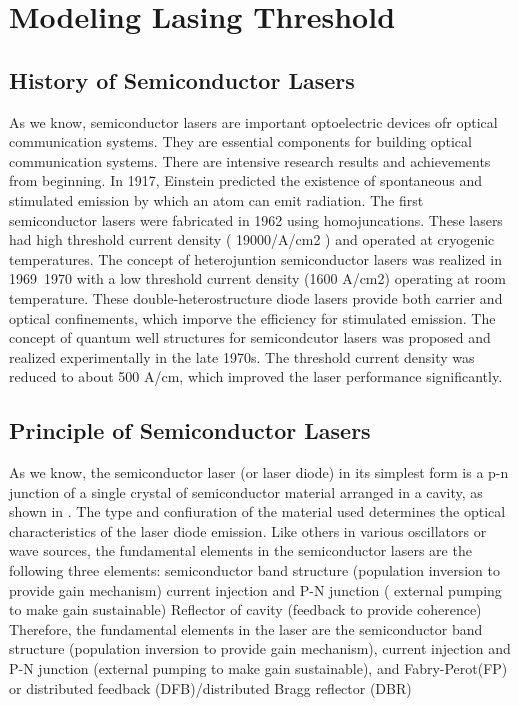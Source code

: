 \chapter{Modeling Lasing Threshold} \label{LT}


\section{History of Semiconductor Lasers} \label{corrections} As we know,
semiconductor lasers are important optoelectric devices ofr optical
communication systems. They are essential components for building optical
communication systems. There are intensive research results and achievements
from beginning.  In 1917, Einstein predicted the existence of spontaneous and
stimulated emission by which an atom can emit radiation. The first
semiconductor lasers were fabricated in 1962 using homojuncations. These lasers
had high threshold current density ( 19000/A/cm2 ) and operated at cryogenic
temperatures.  The concept of heterojuntion semiconductor lasers was realized
in 1969~1970 with a low threshold current density (1600 A/cm2) operating at
room temperature. These double-heterostructure diode lasers provide both
carrier and optical confinements, which imporve the efficiency for stimulated
emission.  The concept of quantum well structures for semicondcutor lasers was
proposed and realized experimentally in the late 1970s. The threshold current
density was reduced to about 500 A/cm, which improved the laser performance
significantly.

\section{Principle of Semiconductor Lasers} \label{corrections}

As we know, the semiconductor laser (or laser diode) in its simplest form is a
p-n junction of a single crystal of semiconductor material arranged in a
cavity, as shown in . The type and confiuration of the material used determines
the optical characteristics of the laser diode emission. Like others in various
oscillators or wave sources, the fundamental elements in the semiconductor
lasers are the following three elements: semiconductor band structure
(population inversion to provide gain mechanism) current injection and P-N
junction ( external pumping to make gain sustainable) Reflector of cavity
(feedback to provide coherence) Therefore, the fundamental elements in the
laser are the semiconductor band structure (population inversion to provide
gain mechanism), current injection and P-N junction (external pumping to make
gain sustainable), and Fabry-Perot(FP) or distributed feedback (DFB)/distributed Bragg reflector (DBR) 

